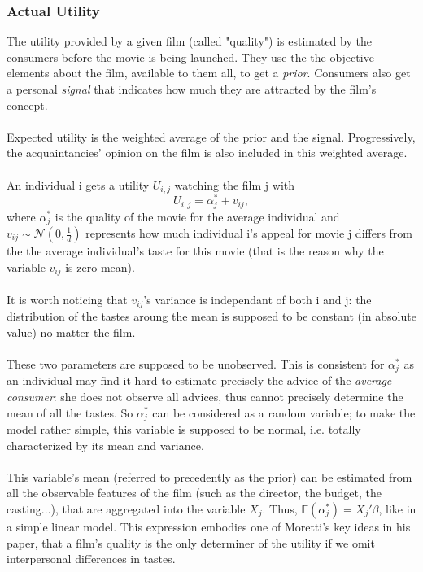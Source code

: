 \subsubsection{Actual Utility}
The utility provided by a given film (called "quality") is estimated by the consumers before the movie is being launched. They use the the objective elements about the film, available to them all, to get a \textit{prior}. Consumers also get a personal \textit{signal} that indicates how much they are attracted by the film's concept.\\
\\
Expected utility is the weighted average of the prior and the signal. Progressively, the acquaintancies' opinion on the film is also included in this weighted average. \\
\\
An individual i gets a utility $U_{i,j}$ watching the film j with\\
\begin{equation} \label{eq:1}
	U_{i,j}=\alpha_{j}^{*}+v_{i j},
\end{equation}
where $\alpha_{j}^{*}$ is the quality of the movie for the average individual and $v_{i j}\sim \mathcal{N}(0,\frac{1}{d})$ represents how much individual i's appeal for movie j differs from the the average individual's taste for this movie (that is the reason why the variable $v_{i j}$ is zero-mean).\\
\\
It is worth noticing that $v_{i j}$'s variance is independant of both i and j: the distribution of the tastes aroung the mean is supposed to be constant (in absolute value) no matter the film.\\
\\
These two parameters are supposed to be unobserved. This is consistent for $\alpha_{j}^{*}$ as an individual may find it hard to estimate precisely the advice of the \textit{average consumer}: she does not observe all advices, thus cannot precisely determine the mean of all the tastes. So $\alpha_{j}^{*}$ can be considered as a random variable; to make the model rather simple, this variable is supposed to be normal, i.e. totally characterized by its mean and variance.\\
\\
This variable's mean (referred to precedently as the prior) can be estimated from all the observable features of the film (such as the director, the budget, the casting...), that are aggregated into the variable $X_{j}$. Thus, $\mathbb{E}(\alpha_{j}^{*})=X_{j}'\beta$, like in a simple linear model. This expression embodies one of Moretti's key ideas in his paper, that a film's quality is the only determiner of the utility if we omit interpersonal differences in tastes.\\
